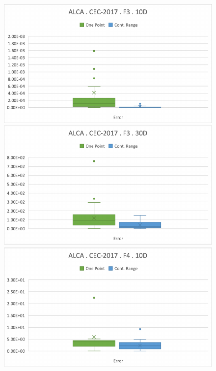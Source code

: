 \documentclass[graybox]{svmult}
\begin{document}
    \begin{figure}[!ht]
        \begin{minipage}[h]{0.49\linewidth}
            \includegraphics[width=1\linewidth]{img/fig_experiment_F3x10D.pdf} 
        \end{minipage}
        \hfill
        \vspace{0.05 cm}
        \begin{minipage}[h]{0.49\linewidth}
            \includegraphics[width=1\linewidth]{img/fig_experiment_F3x30D.pdf} 
        \end{minipage}
        \vfill
        \vspace{0.05 cm}
        \begin{minipage}[h]{0.49\linewidth}
            \includegraphics[width=1\linewidth]{img/fig_experiment_F4x10D.pdf} 

\end{minipage}
\end{figure}
\end{document}
